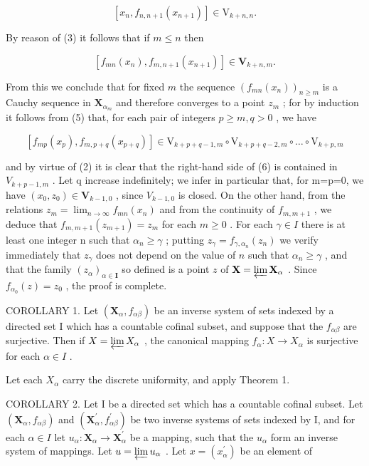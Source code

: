 \[
\left[ x _ {n}, f _ {n, n + 1} \left(x _ {n + 1}\right) \right] \in \mathrm{V} _ {k + n, n}.\tag{4}
\]

By reason of (3) it follows that if \(m \leqslant n\) then

\[
\left[ f _ {m n} (x _ {n}), f _ {m, n + 1} (x _ {n + 1}) \right] \in \mathbf {V} _ {k + n, m}.\tag{5}
\]

From this we conclude that for fixed \(m\) the sequence \((f_{mn}(x_n))_{n\geqslant m}\) is a Cauchy sequence in \(\mathbf{X}_{\alpha_m}\) and therefore converges to a point \(z_m\) ; for by induction it follows from (5) that, for each pair of integers \(p\geqslant m,q > 0\) , we have

\[
\left[ f _ {m p} (x _ {p}), f _ {m, p + q} (x _ {p + q}) \right] \in \mathrm{V} _ {k + p + q - 1, m} \circ \mathrm{V} _ {k + p + q - 2, m} \circ \dots \circ \mathrm{V} _ {k + p, m}\tag{6}
\]

and by virtue of (2) it is clear that the right-hand side of (6) is contained in \(V_{k+p-1,m}\) . Let q increase indefinitely; we infer in particular that, for m=p=0, we have \((x_{0},z_{0})\in\mathbf{V}_{k-1,0}\) , since \(V_{k-1,0}\) is closed. On the other hand, from the relations \(z_{m}=\lim_{n\to\infty}f_{mn}(x_{n})\) and from the continuity of \(f_{m,m+1}\) , we deduce that \(f_{m,m+1}(z_{m+1})=z_{m}\) for each \(m\geqslant0\) . For each \(\gamma\in I\) there is at least one integer n such that \(\alpha_{n}\geqslant\gamma\) ; putting \(z_{\gamma} = f_{\gamma, \alpha_n}(z_n)\) we verify immediately that \(z_{\gamma}\) does not depend on the value of \(n\) such that \(\alpha_n \geqslant \gamma\) , and that the family \((z_\alpha)_{\alpha \in \mathbf{I}}\) so defined is a point \(z\) of \(\mathbf{X} = \varprojlim \mathbf{X}_\alpha\) . Since \(f_{\alpha_0}(z) = z_0\) , the proof is complete.

COROLLARY 1. Let \((\mathbf{X}_{\alpha}, f_{\alpha\beta})\) be an inverse system of sets indexed by a directed set I which has a countable cofinal subset, and suppose that the \(f_{\alpha\beta}\) are surjective. Then if \(X = \varprojlim X_{\alpha}\) , the canonical mapping \(f_{\alpha}: X \to X_{\alpha}\) is surjective for each \(\alpha \in I\) .

Let each \(X_{\alpha}\) carry the discrete uniformity, and apply Theorem 1.

COROLLARY 2. Let I be a directed set which has a countable cofinal subset. Let \((\mathbf{X}_{\alpha}, f_{\alpha \beta})\) and \((\mathbf{X}_{\alpha}^{\prime}, f_{\alpha \beta}^{\prime})\) be two inverse systems of sets indexed by I, and for each \(\alpha \in I\) let \(u_{\alpha}: \mathbf{X}_{\alpha} \to \mathbf{X}_{\alpha}^{\prime}\) be a mapping, such that the \(u_{\alpha}\) form an inverse system of mappings. Let \(u = \varprojlim u_{\alpha}\) . Let \(x = (x_{\alpha}^{\prime})\) be an element of

